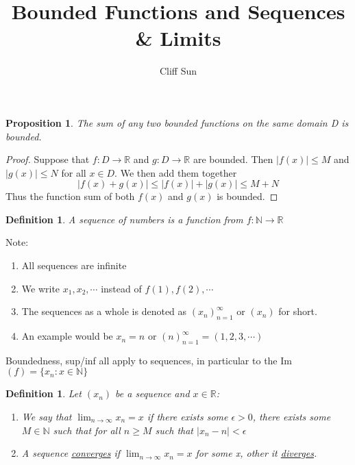 \documentclass{article}
\title{Bounded Functions and Sequences \& Limits}
\author{Cliff Sun}
\newtheorem{definition}[theorem]{Definition}
\newtheorem{proposition}[theorem]{Proposition}
\newtheorem{one minute paper}[theorem]{One Minute Paper}
\begin{document}
\maketitle

\begin{proposition}

The sum of any two bounded functions on the same domain D is bounded. 

\end{proposition}

\begin{proof}
    Suppose that $f: D \rightarrow \mathbb{R}$ and $g: D \rightarrow \mathbb{R}$ are bounded. Then $|f(x)| \leq M$ and $|g(x)| \leq N$ for all $x \in D$. We then add them together
    \begin{equation}
        |f(x) + g(x)| \leq |f(x)| + |g(x)| \leq M + N
    \end{equation}
    Thus the function sum of both $f(x)$ and $g(x)$ is bounded. 
\end{proof}

\begin{definition}
    A sequence of numbers is a function from $f: \mathbb{N} \rightarrow \mathbb{R}$
\end{definition}

Note:
\begin{enumerate}
    \item All sequences are infinite
    \item We write $x_1, x_2, \cdots$ instead of $f(1), f(2), \cdots$
    \item The sequences as a whole is denoted as $(x_n)_{n=1}^{\infty}$ or $(x_n)$ for short. 
    \item An example would be $x_n = n$ or $(n)_{n=1}^{\infty} = (1,2,3,\cdots)$
\end{enumerate}

Boundedness, sup/inf all apply to sequences, in particular to the Im$(f) = \{x_n : x \in \mathbb{N}\}$

\begin{definition}
    Let $(x_n)$ be a sequence and $x \in \mathbb{R}$:
    \begin{enumerate}
        \item We say that $\lim_{n\rightarrow \infty}x_n = x$ if there exists some $\epsilon > 0$, there exists some $M \in \mathbb{N}$ such that for all $n \geq M$ such that $|x_n - n| < \epsilon$
        \item A sequence \underline{converges} if $\lim_{n\rightarrow \infty}x_n = x$ for some x, other it \underline{diverges}.
    \end{enumerate}
\end{definition}
\end{document}
